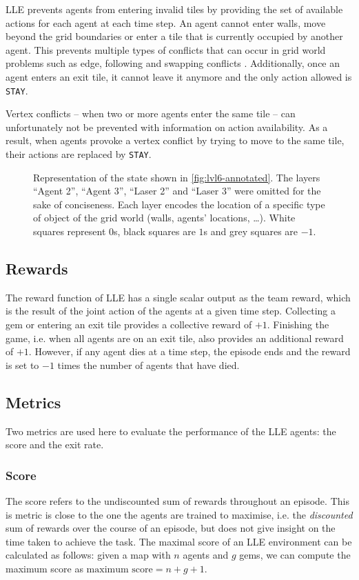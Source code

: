 LLE prevents agents from entering invalid tiles by providing the set of available actions for each agent at each time step. An agent cannot enter walls, move beyond the grid boundaries or enter a tile that is currently occupied by another agent. This prevents multiple types of conflicts that can occur in grid world problems such as edge, following and swapping conflicts \citep{stern_multi-agent_2017_conflicts}.  Additionally, once an agent enters an exit tile, it cannot leave it anymore and the only action allowed is \texttt{STAY}. 

Vertex conflicts -- when two or more agents enter the same tile -- can unfortunately not be prevented with information on action availability. As a result, when agents provoke a vertex conflict by trying to move to the same tile, their actions are replaced by \texttt{STAY}.

\begin{figure}[t]
    \centering
    
    \caption{Representation of the state shown in \autoref{fig:lvl6-annotated}. The layers ``Agent 2'', ``Agent 3'', ``Laser 2'' and ``Laser 3'' were omitted for the sake of conciseness. Each layer encodes the location of a specific type of object of the grid world (walls, agents' locations, \dots). White squares represent $0$s, black squares are $1$s and grey squares are $-1$.}
    \label{fig:layered}
\end{figure}

\subsection{Rewards}
\label{sec:rewards}
The reward function of LLE has a single scalar output as the team reward, which is the result of the joint action of the agents at a given time step. Collecting a gem or entering an exit tile provides a collective reward of $+1$. Finishing the game, i.e. when all agents are on an exit tile, also provides an additional reward of $+1$. However, if any agent dies at a time step, the episode ends and the reward is set to $-1$ times the number of agents that have died.


\subsection{Metrics}
\label{sec:metrics}
Two metrics are used here to evaluate the performance of the LLE agents: the score and the exit rate.

\subsubsection{Score}
The score refers to the undiscounted sum of rewards throughout an episode. This is metric is close to the one the agents are trained to maximise, i.e. the \textit{discounted} sum of rewards over the course of an episode, but does not give insight on the time taken to achieve the task. The maximal score of an LLE environment can be calculated as follows: given a map with $n$ agents and $g$ gems, we can compute the maximum score as $\text{maximum score} = n + g + 1$.


